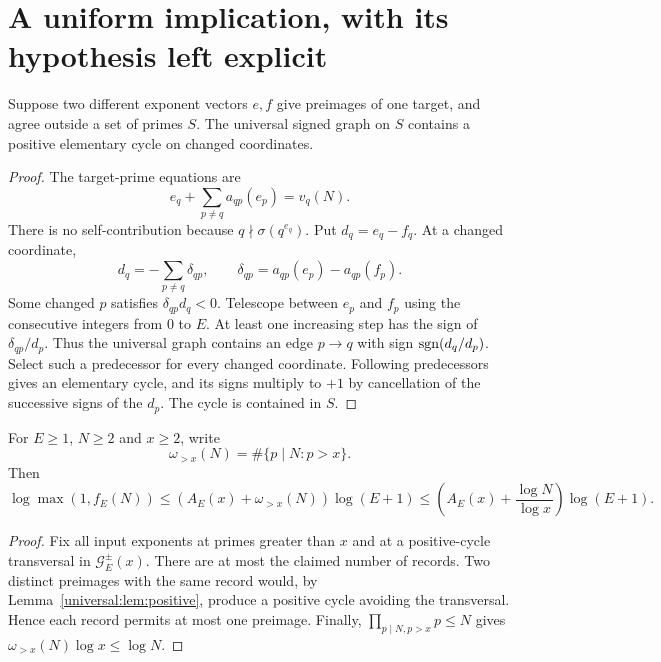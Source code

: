 \section{A uniform implication, with its hypothesis left explicit}
\begin{lemma}\label{universal:lem:positive}
Suppose two different exponent vectors $e,f$ give preimages of one target, and agree outside a set of primes $S$. The universal signed graph on $S$ contains a positive elementary cycle on changed coordinates.
\end{lemma}
\begin{proof}
The target-prime equations are
\[
 e_q+\sum_{p\ne q}a_{qp}(e_p)=v_q(N).
\]
There is no self-contribution because $q\nmid\sigma(q^{e_q})$. Put $d_q=e_q-f_q$. At a changed coordinate,
\[
 d_q=-\sum_{p\ne q}\delta_{qp},\qquad
 \delta_{qp}=a_{qp}(e_p)-a_{qp}(f_p).
\]
Some changed $p$ satisfies $\delta_{qp}d_q<0$. Telescope between $e_p$ and $f_p$ using the consecutive integers from $0$ to $E$. At least one increasing step has the sign of $\delta_{qp}/d_p$. Thus the universal graph contains an edge $p\to q$ with sign $\operatorname{sgn}(d_q/d_p)$. Select such a predecessor for every changed coordinate. Following predecessors gives an elementary cycle, and its signs multiply to $+1$ by cancellation of the successive signs of the $d_p$. The cycle is contained in $S$.
\end{proof}

\begin{theorem}\label{universal:thm:cutoff}
For $E\ge1$, $N\ge2$ and $x\ge2$, write
\[
 \omega_{>x}(N)=\#\{p\mid N:p>x\}.
\]
Then
\begin{equation}\label{universal:eq:cutoff}
 \boxed{\log\max(1,f_E(N))\le
 \left(A_E(x)+\omega_{>x}(N)\right)\log(E+1)
 \le\left(A_E(x)+\frac{\log N}{\log x}\right)\log(E+1).}
\end{equation}
\end{theorem}
\begin{proof}
Fix all input exponents at primes greater than $x$ and at a positive-cycle transversal in $\mathcal G_E^{\pm}(x)$. There are at most the claimed number of records. Two distinct preimages with the same record would, by Lemma~\ref{universal:lem:positive}, produce a positive cycle avoiding the transversal. Hence each record permits at most one preimage. Finally, $\prod_{p\mid N,p>x}p\le N$ gives $\omega_{>x}(N)\log x\le\log N$.
\end{proof}


